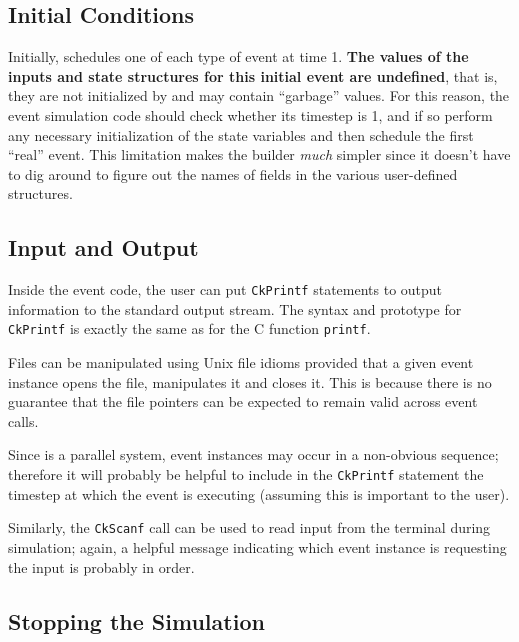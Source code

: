 \subsection{Initial Conditions}

Initially, \dispare schedules one of each type of event at time 1.  {\bf
The values of the inputs and state structures for this initial event are
undefined}, that is, they are not initialized by \dispare and may
contain ``garbage'' values.  For this reason, the event simulation code
should check whether its timestep is 1, and if so perform any necessary
initialization of the state variables and then schedule the first
``real'' event.  This limitation makes the builder {\em much} simpler
since it doesn't have to dig around to figure out the names of fields in
the various user-defined structures.

\subsection{Input and Output}

Inside the event code, the user can put {\tt CkPrintf} statements to
output information to the standard output stream.  The syntax and
prototype for {\tt CkPrintf} is exactly the same as for the C function
{\tt printf}.  

Files can be manipulated using Unix file idioms provided that a given
event instance opens the file, manipulates it and closes it.  This is
because there is no guarantee that the file pointers can be expected to
remain valid across event calls.

Since \dispare is a parallel system, event instances may occur in a
non-obvious sequence; therefore it will probably be helpful to include
in the {\tt CkPrintf} statement the timestep at which the event is
executing (assuming this is important to the user).

Similarly, the {\tt CkScanf} call can be used to read input from the
terminal during simulation; again, a helpful message indicating which
event instance is requesting the input is probably in order.

\subsection{Stopping the Simulation}

